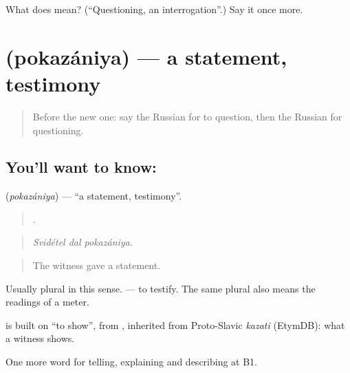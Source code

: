 \begin{tcolorbox}[breakable,colback=teal!4,colframe=teal!35!black,title={Before you move on}]
What does  mean? (\textquotedblleft{}Questioning, an interrogation\textquotedblright{}.) Say it once more.
\end{tcolorbox}
\section[\texorpdfstring{\ru{показания} (pokazániya)}{показания (pokazániya)}]{ (pokazániya) — a statement, testimony}

\label{lesson:RU-C292-pokazaniya}



\begin{quote}
Before the new one: say the Russian for to question, then the Russian for questioning.
\end{quote}

\subsection*{You'll want to know: }
\textbf{} (\emph{pokazániya}) — \textquotedblleft{}a statement, testimony\textquotedblright{}.

\begin{quote}
  .
\end{quote}

\begin{quote}
\emph{Svidétel dal pokazániya.}
\end{quote}

\begin{quote}
The witness gave a statement.
\end{quote}

Usually plural in this sense. \emph{ } — to testify. The same plural also means the readings of a meter.

\begin{cousinweb}
\emph{} is built on \emph{} \textquotedblleft{}to show\textquotedblright{}, from \emph{}, inherited from Proto-Slavic \emph{kazati} (EtymDB): what a witness shows.
\end{cousinweb}

\begin{grammarlens}[title={What you've built}]
One more word for telling, explaining and describing at B1.
\end{grammarlens}

